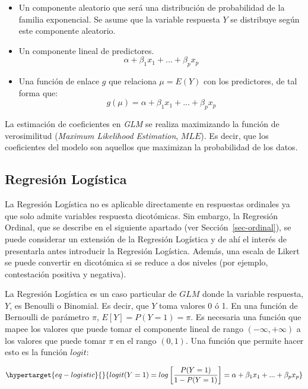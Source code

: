 \documentclass[
  12pt,
  a4paper,
  extrafontsizes,
  onecolumn,
  openright,
  table]{memoir}
\begin{document}
\begin{itemize}
\item
  Un componente aleatorio que será una distribución de probabilidad de
  la familia exponencial. Se asume que la variable respuesta \(Y\) se
  distribuye según este componente aleatorio.
\item
  Un componente lineal de predictores. \[
  \alpha+\beta_1x_1+...+\beta_px_p
  \]
\item
  Una función de enlace \(g\) que relaciona \(\mu=E(Y)\) con los
  predictores, de tal forma que: \[
  g(\mu)=\alpha+\beta_1x_1+...+\beta_px_p
  \]
\end{itemize}

La estimación de coeficientes en \emph{GLM} se realiza maximizando la
función de verosimilitud (\emph{Maximum Likelihood Estimation},
\(MLE\)). Es decir, que los coeficientes del modelo son aquellos que
maximizan la probabilidad de los datos.

\hypertarget{sec-logistica}{%
\subsection{Regresión Logística}\label{sec-logistica}}

La Regresión Logística no es aplicable directamente en respuestas
ordinales ya que solo admite variables respuesta dicotómicas. Sin
embargo, la Regresión Ordinal, que se describe en el siguiente apartado
(ver Sección~\ref{sec-ordinal}), se puede considerar un extensión de la
Regresión Logística y de ahí el interés de presentarla antes introducir
la Regresión Logística. Además, una escala de Likert se puede convertir
en dicotómica si se reduce a dos niveles (por ejemplo, contestación
positiva y negativa).

La Regresión Logística \autocite[ver][pp.~68-69]{agresti_2018} es un
caso particular de \(GLM\) donde la variable respuesta, \(Y\), es
Benoulli o Binomial. Es decir, que \(Y\) toma valores 0 ó 1. En una
función de Bernoulli de parámetro \(\pi\), \(E[Y] = P(Y=1) = \pi\). Es
necesaria una función que mapee los valores que puede tomar el
componente lineal de rango \((-\infty, +\infty)\) a los valores que
puede tomar \(\pi\) en el rango \((0, 1)\). Una función que permite
hacer esto es la función \(logit\):

\begin{equation}\protect\hypertarget{eq-logistic}{}{
logit(Y=1) = log \left[\frac{P(Y=1)}{1-P(Y=1)} \right] = \alpha+\beta_1x_1+...+\beta_px_p
}\label{eq-logistic}\end{equation}
\end{document}
